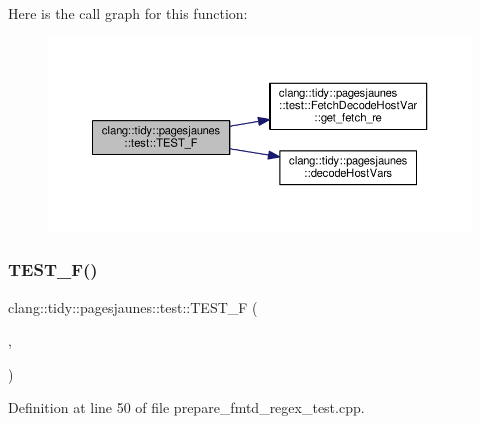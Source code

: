 Here is the call graph for this function\+:
\nopagebreak
\begin{figure}[H]
\begin{center}
\leavevmode
\includegraphics[width=350pt]{namespaceclang_1_1tidy_1_1pagesjaunes_1_1test_aa06fc088c3ba5f8b86254ed10d643a32_cgraph}
\end{center}
\end{figure}
\mbox{\label{namespaceclang_1_1tidy_1_1pagesjaunes_1_1test_adefa0c55e6339f7e62c34be0a20923fa}} 
\subsubsection{\texorpdfstring{T\+E\+S\+T\+\_\+\+F()}{TEST\_F()}\hspace{0.1cm}{\footnotesize\ttfamily [4/57]}}
{\footnotesize\ttfamily clang\+::tidy\+::pagesjaunes\+::test\+::\+T\+E\+S\+T\+\_\+F (\begin{DoxyParamCaption}\item[{\hyperlink{classclang_1_1tidy_1_1pagesjaunes_1_1test_1_1_prepare_fmtd_regex_test}{Prepare\+Fmtd\+Regex\+Test}}]{,  }\item[{Regex\+Matching}]{ }\end{DoxyParamCaption})}



Definition at line 50 of file prepare\+\_\+fmtd\+\_\+regex\+\_\+test.\+cpp.

